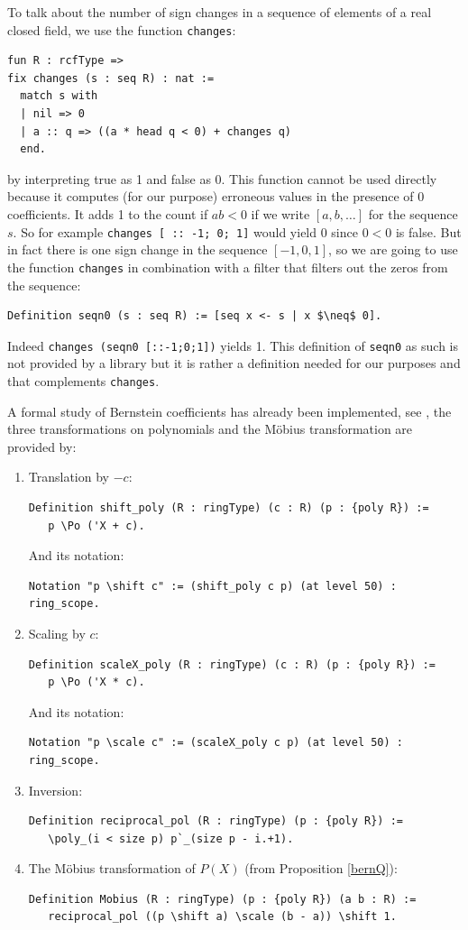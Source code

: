 \documentclass[11pt, a4paper]{article}
\begin{document}
To talk about the number of sign changes in a sequence of elements of a real closed field, we use the function \lstinline!changes!: %
\begin{lstlisting}
fun R : rcfType =>
fix changes (s : seq R) : nat :=
  match s with
  | nil => 0
  | a :: q => ((a * head q < 0) + changes q)
  end.
\end{lstlisting}
by interpreting true as 1 and false as 0. This function cannot be used directly because it computes (for our purpose) erroneous values in the presence of 0 coefficients. It adds 1 to the count if $ab < 0$ if we write $[a,b,\ldots]$ for the sequence $s$. So for example \lstinline!changes [ :: -1; 0; 1]! would yield 0 since $0 < 0$ is false. But in fact there is one sign change in the sequence $[-1,0,1]$, so we are going to use the function \lstinline!changes! in combination with a filter that filters out the zeros from the sequence:
\begin{lstlisting}
Definition seqn0 (s : seq R) := [seq x <- s | x $\neq$ 0]. 
\end{lstlisting}
Indeed \lstinline!changes (seqn0 [::-1;0;1])! yields 1. This definition of \lstinline!seqn0! as such is not provided by a library but it is rather a definition needed for our purposes and that complements \lstinline!changes!.

A formal study of Bernstein coefficients has already been implemented, see \cite{bernstein}, the three transformations on polynomials and the M\"obius transformation are provided by:%
\begin{enumerate}
\item Translation by $-c$:
\begin{lstlisting}
Definition shift_poly (R : ringType) (c : R) (p : {poly R}) :=
   p \Po ('X + c).
\end{lstlisting}
And its notation:
\begin{lstlisting}
Notation "p \shift c" := (shift_poly c p) (at level 50) : ring_scope.
\end{lstlisting}
\item Scaling by $c$:
\begin{lstlisting}
Definition scaleX_poly (R : ringType) (c : R) (p : {poly R}) :=
   p \Po ('X * c).
\end{lstlisting}
And its notation:
\begin{lstlisting}
Notation "p \scale c" := (scaleX_poly c p) (at level 50) : ring_scope.
\end{lstlisting}
\item Inversion:
\begin{lstlisting}
Definition reciprocal_pol (R : ringType) (p : {poly R}) :=
   \poly_(i < size p) p`_(size p - i.+1).
\end{lstlisting}
\item The M\"obius transformation of $P(X)$ (from Proposition \ref{bernQ}):
\begin{lstlisting}
Definition Mobius (R : ringType) (p : {poly R}) (a b : R) :=
   reciprocal_pol ((p \shift a) \scale (b - a)) \shift 1.
\end{lstlisting}
\end{enumerate}
\end{document}
